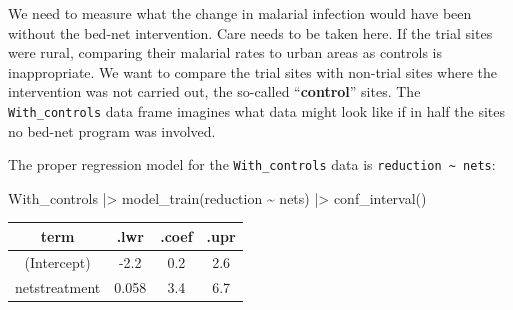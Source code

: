 \documentclass[
  letterpaper,
  DIV=11,
  numbers=noendperiod,
  oneside]{scrartcl}
\newenvironment{Shaded}{\begin{snugshade}}{\end{snugshade}}
\newcommand{\FunctionTok}[1]{\textcolor[rgb]{0.28,0.35,0.67}{#1}}
\newcommand{\NormalTok}[1]{\textcolor[rgb]{0.00,0.23,0.31}{#1}}
\newcommand{\SpecialCharTok}[1]{\textcolor[rgb]{0.37,0.37,0.37}{#1}}
\begin{document}
We need to measure what the change in malarial infection would have been
without the bed-net intervention. Care needs to be taken here. If the
trial sites were rural, comparing their malarial rates to urban areas as
controls is inappropriate. We want to compare the trial sites with
non-trial sites where the intervention was not carried out, the
so-called ``\textbf{control}'' sites. The \texttt{With\_controls} data
frame imagines what data might look like if in half the sites no bed-net
program was involved.


The proper regression model for the \texttt{With\_controls} data is
\texttt{reduction\ \textasciitilde{}\ nets}:

\begin{Shaded}
\begin{Highlighting}[]
\NormalTok{With\_controls }\SpecialCharTok{|\textgreater{}} 
  \FunctionTok{model\_train}\NormalTok{(reduction }\SpecialCharTok{\textasciitilde{}}\NormalTok{ nets) }\SpecialCharTok{|\textgreater{}} 
  \FunctionTok{conf\_interval}\NormalTok{() }
\end{Highlighting}
\end{Shaded}

\begin{longtable}[]{@{}cccc@{}}
\toprule\noalign{}
term & .lwr & .coef & .upr \\
\midrule\noalign{}
\endhead
\bottomrule\noalign{}
\endlastfoot
(Intercept) & -2.2 & 0.2 & 2.6 \\
netstreatment & 0.058 & 3.4 & 6.7 \\
\end{longtable}
\end{document}
